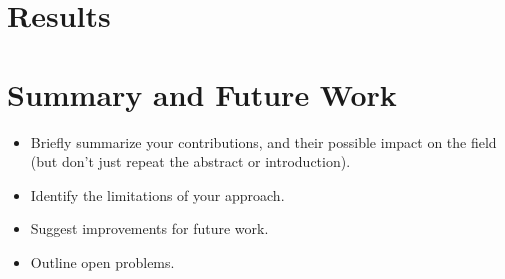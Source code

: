 \documentclass[10pt]{article}
\begin{document}
\section{Results}\label{sec:Results}
%
%
%
%
%
%
%
%
%


\section{Summary and Future Work}\label{sec:Summary}
\begin{itemize}
\item Briefly summarize your contributions, and their possible
impact on the field (but don't just repeat the abstract or introduction).
\item Identify the limitations of your approach.
\item Suggest improvements for future work.
\item Outline open problems.
\end{itemize}



\end{document}

